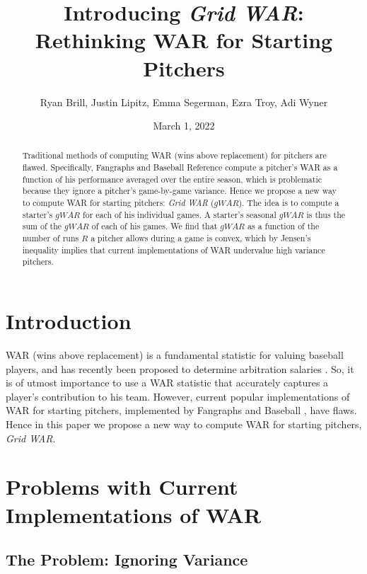 \documentclass[12pt]{article}
\title{Introducing \textit{Grid WAR}: \\ Rethinking WAR for Starting Pitchers}
\author{Ryan Brill, Justin Lipitz, Emma Segerman, Ezra Troy, Adi Wyner}
\date{March 1, 2022}
\begin{document}
\maketitle

\begin{abstract}
Traditional methods of computing WAR (wins above replacement) for pitchers are flawed. Specifically, Fangraphs and Baseball Reference compute a pitcher's WAR as a function of his performance averaged over the entire season, which is problematic because they ignore a pitcher's game-by-game variance.  Hence we propose a new way to compute WAR for starting pitchers: \textit{Grid WAR} ($gWAR$). The idea is to compute a starter's $gWAR$ for each of his individual games. A starter's seasonal $gWAR$ is thus the sum of the $gWAR$ of each of his games. We find that $gWAR$ as a function of the number of runs $R$ a pitcher allows during a game is convex, which by Jensen's inequality implies that current implementations of WAR undervalue high variance pitchers.
\end{abstract}

\section{Introduction}


WAR (wins above replacement) is a fundamental statistic for valuing baseball players, and has recently been proposed to determine arbitration salaries \citep{war_arb}. So, it is of utmost importance to use a WAR statistic that accurately captures a player's contribution to his team. However, current popular implementations of WAR for starting pitchers, implemented by Fangraphs \citep{war_FG} and Baseball \citet{war_BR}, have flaws. Hence in this paper we propose a new way to compute WAR for starting pitchers, \textit{Grid WAR}. 

\section{Problems with Current Implementations of WAR}

\subsection{The Problem: Ignoring Variance}
\end{document}
